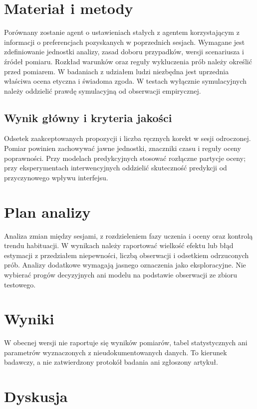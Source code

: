 \documentclass[11pt,a4paper]{article}
\begin{document}
\section{Materiał i metody}

Porównany zostanie agent o ustawieniach stałych z agentem korzystającym z informacji o preferencjach pozyskanych w poprzednich sesjach. Wymagane jest zdefiniowanie jednostki analizy, zasad doboru przypadków, wersji scenariusza i źródeł pomiaru. Rozkład warunków oraz reguły wykluczenia prób należy określić przed pomiarem. W badaniach z udziałem ludzi niezbędna jest uprzednia właściwa ocena etyczna i świadoma zgoda. W testach wyłącznie symulacyjnych należy oddzielić prawdę symulacyjną od obserwacji empirycznej.

\subsection{Wynik główny i kryteria jakości}

Odsetek zaakceptowanych propozycji i liczba ręcznych korekt w sesji odroczonej. Pomiar powinien zachowywać jawne jednostki, znaczniki czasu i reguły oceny poprawności. Przy modelach predykcyjnych stosować rozłączne partycje oceny; przy eksperymentach interwencyjnych oddzielić skuteczność predykcji od przyczynowego wpływu interfejsu.

\section{Plan analizy}

Analiza zmian między sesjami, z rozdzieleniem fazy uczenia i oceny oraz kontrolą trendu habituacji. W wynikach należy raportować wielkość efektu lub błąd estymacji z przedziałem niepewności, liczbą obserwacji i odsetkiem odrzuconych prób. Analizy dodatkowe wymagają jasnego oznaczenia jako eksploracyjne. Nie wybierać progów decyzyjnych ani modelu na podstawie obserwacji ze zbioru testowego.

\section{Wyniki}

W obecnej wersji nie raportuje się wyników pomiarów, tabel statystycznych ani parametrów wyznaczonych z nieudokumentowanych danych. To kierunek badawczy, a nie zatwierdzony protokół badania ani zgłoszony artykuł.

\section{Dyskusja}
\end{document}
